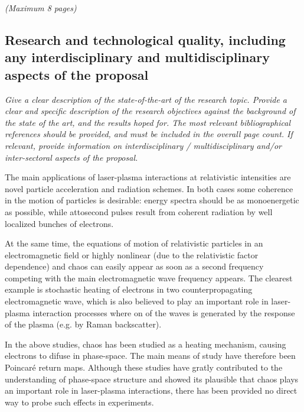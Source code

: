 \documentclass[a4paper,11pt]{article}
\newenvironment{xcomment}{\em}{}
\begin{document}
\begin{bibunit}

\begin{xcomment}  
(Maximum 8 pages)  
\end{xcomment}

\subsection{Research and technological quality, including any interdisciplinary and multidisciplinary aspects of the proposal}

\begin{xcomment}
Give a clear description of the state-of-the-art of the research topic. Provide a clear and specific
description of the research objectives against the background of the state of the art, and the
results hoped for. The most relevant bibliographical references should be provided, and must be
included in the overall page count. If relevant, provide information on interdisciplinary /
multidisciplinary and/or inter-sectoral aspects of the proposal.
\end{xcomment}

The main applications of laser-plasma interactions at relativistic intensities are novel particle
acceleration and radiation schemes. In both cases some coherence in the motion of particles is
desirable: energy spectra should be as monoenergetic as possible, while attosecond pulses result
from coherent radiation by well localized bunches of electrons.

At the same time, the equations of motion of relativistic particles in an electromagnetic field or
highly nonlinear (due to the relativistic factor dependence) and chaos can easily appear as soon
as a second frequency competing with the main electromagnetic wave frequency appears. The clearest
example is stochastic heating of electrons in two counterpropagating electromagnetic wave, which
is also believed to play an important role in laser-plasma interaction processes where on of the
waves is generated by the response of the plasma (e.g. by Raman backscatter).

In the above studies, chaos has been studied as a heating mechanism, causing electrons to difuse
in phase-space. The main means of study have therefore been Poincar\'e return maps. Although these
studies have gratly contributed to the understanding of phase-space structure and showed its
plausible that chaos plays an important role in laser-plasma interactions, there has been provided no
direct way to probe such effects in experiments.


\end{bibunit}
\end{document}
